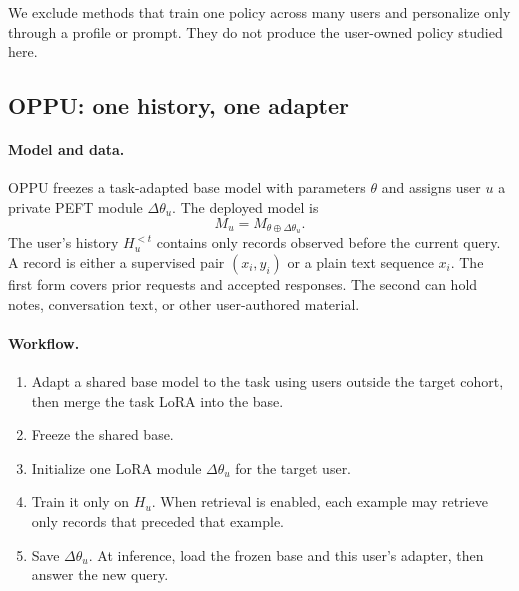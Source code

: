 We exclude methods that train one policy across many users and personalize
only through a profile or prompt.  They do not produce the user-owned policy
studied here.

\subsection{OPPU: one history, one adapter}

\paragraph{Model and data.}
OPPU freezes a task-adapted base model with parameters $\theta$ and assigns
user $u$ a private PEFT module $\Delta\theta_u$.  The deployed model is
\begin{equation}
  M_u = M_{\theta\oplus\Delta\theta_u}.
  \label{eq:oppu-model}
\end{equation}
The user's history $H_u^{<t}$ contains only records observed before the
current query.  A record is either a supervised pair $(x_i,y_i)$ or a plain
text sequence $x_i$.  The first form covers prior requests and accepted
responses.  The second can hold notes, conversation text, or other
user-authored material.

\paragraph{Workflow.}
\begin{enumerate}
  \item Adapt a shared base model to the task using users outside the target
  cohort, then merge the task LoRA into the base.
  \item Freeze the shared base.
  \item Initialize one LoRA module $\Delta\theta_u$ for the target user.
  \item Train it only on $H_u$.  When retrieval is enabled, each example may
  retrieve only records that preceded that example.
  \item Save $\Delta\theta_u$.  At inference, load the frozen base and this
  user's adapter, then answer the new query.
\end{enumerate}

